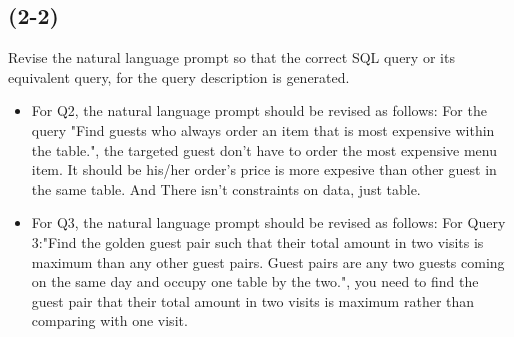 \documentclass{article}
\begin{document}
\subsection*{(2-2)}
Revise the natural language prompt so that the correct SQL query or its
equivalent query, for the query description is generated.
\begin{itemize}
    \item For Q2, the natural language prompt should be revised as follows:
    \subitem For the query "Find guests who always order an item that is most expensive within the table.", the targeted guest don't have to order the most expensive menu item. It should be his/her order's price is more expesive than other guest in the same table. And There isn't constraints on data, just table.
    \item For Q3, the natural language prompt should be revised as follows:
    \subitem For Query 3:"Find the golden guest pair such that their total amount in two visits is maximum
    than any other guest pairs. Guest pairs are any two guests coming on the same day
    and occupy one table by the two.", you need to find the guest pair that their total amount in two visits is maximum rather than comparing with one visit.
\end{itemize}
\end{document}
